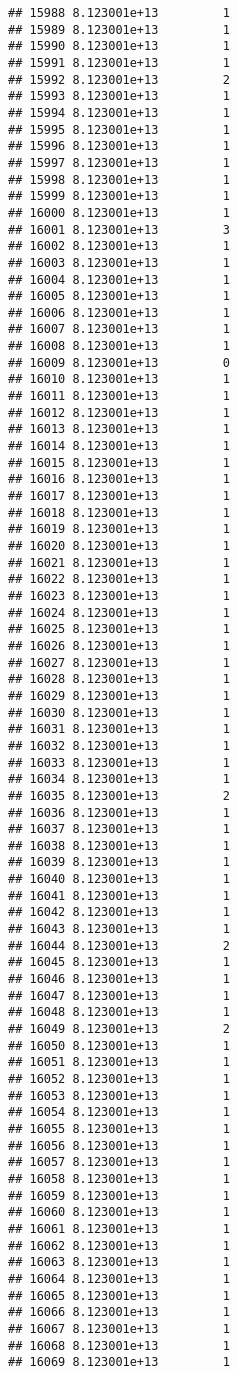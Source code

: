 \documentclass[
]{article}
\begin{document}
\begin{verbatim}
## 15988 8.123001e+13         1
## 15989 8.123001e+13         1
## 15990 8.123001e+13         1
## 15991 8.123001e+13         1
## 15992 8.123001e+13         2
## 15993 8.123001e+13         1
## 15994 8.123001e+13         1
## 15995 8.123001e+13         1
## 15996 8.123001e+13         1
## 15997 8.123001e+13         1
## 15998 8.123001e+13         1
## 15999 8.123001e+13         1
## 16000 8.123001e+13         1
## 16001 8.123001e+13         3
## 16002 8.123001e+13         1
## 16003 8.123001e+13         1
## 16004 8.123001e+13         1
## 16005 8.123001e+13         1
## 16006 8.123001e+13         1
## 16007 8.123001e+13         1
## 16008 8.123001e+13         1
## 16009 8.123001e+13         0
## 16010 8.123001e+13         1
## 16011 8.123001e+13         1
## 16012 8.123001e+13         1
## 16013 8.123001e+13         1
## 16014 8.123001e+13         1
## 16015 8.123001e+13         1
## 16016 8.123001e+13         1
## 16017 8.123001e+13         1
## 16018 8.123001e+13         1
## 16019 8.123001e+13         1
## 16020 8.123001e+13         1
## 16021 8.123001e+13         1
## 16022 8.123001e+13         1
## 16023 8.123001e+13         1
## 16024 8.123001e+13         1
## 16025 8.123001e+13         1
## 16026 8.123001e+13         1
## 16027 8.123001e+13         1
## 16028 8.123001e+13         1
## 16029 8.123001e+13         1
## 16030 8.123001e+13         1
## 16031 8.123001e+13         1
## 16032 8.123001e+13         1
## 16033 8.123001e+13         1
## 16034 8.123001e+13         1
## 16035 8.123001e+13         2
## 16036 8.123001e+13         1
## 16037 8.123001e+13         1
## 16038 8.123001e+13         1
## 16039 8.123001e+13         1
## 16040 8.123001e+13         1
## 16041 8.123001e+13         1
## 16042 8.123001e+13         1
## 16043 8.123001e+13         1
## 16044 8.123001e+13         2
## 16045 8.123001e+13         1
## 16046 8.123001e+13         1
## 16047 8.123001e+13         1
## 16048 8.123001e+13         1
## 16049 8.123001e+13         2
## 16050 8.123001e+13         1
## 16051 8.123001e+13         1
## 16052 8.123001e+13         1
## 16053 8.123001e+13         1
## 16054 8.123001e+13         1
## 16055 8.123001e+13         1
## 16056 8.123001e+13         1
## 16057 8.123001e+13         1
## 16058 8.123001e+13         1
## 16059 8.123001e+13         1
## 16060 8.123001e+13         1
## 16061 8.123001e+13         1
## 16062 8.123001e+13         1
## 16063 8.123001e+13         1
## 16064 8.123001e+13         1
## 16065 8.123001e+13         1
## 16066 8.123001e+13         1
## 16067 8.123001e+13         1
## 16068 8.123001e+13         1
## 16069 8.123001e+13         1

\end{verbatim}
\end{document}
